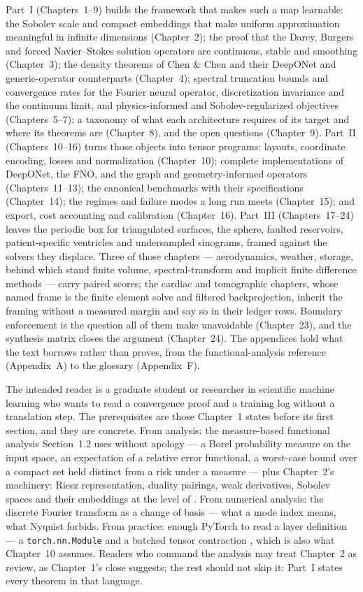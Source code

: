 Part~I (Chapters~1--9) builds the framework that makes such a map learnable: the Sobolev scale
and compact embeddings that make uniform approximation meaningful in infinite dimensions
(Chapter~2); the proof that the Darcy, Burgers and forced Navier--Stokes solution operators are
continuous, stable and smoothing (Chapter~3); the density theorems of Chen \& Chen and their
DeepONet and generic-operator counterparts (Chapter~4); spectral truncation bounds and
convergence rates for the Fourier neural operator, discretization invariance and the continuum
limit, and physics-informed and Sobolev-regularized objectives (Chapters~5--7); a taxonomy
of what each architecture requires of its target and where its theorems are (Chapter~8), and
the open questions (Chapter~9). Part~II (Chapters~10--16)
turns those objects into tensor programs: layouts, coordinate encoding, losses and normalization
(Chapter~10); complete implementations of DeepONet, the FNO, and the graph and geometry-informed
operators (Chapters~11--13); the canonical benchmarks with their specifications (Chapter~14);
the regimes and failure modes a long run meets (Chapter~15); and export, cost accounting and
calibration (Chapter~16). Part~III (Chapters~17--24) leaves the periodic box for triangulated
surfaces, the sphere, faulted reservoirs, patient-specific ventricles and undersampled
sinograms, framed against the solvers they displace. Three of those chapters --- aerodynamics,
weather, storage, behind which stand finite volume, spectral-transform and implicit finite
difference methods --- carry paired scores; the cardiac and tomographic chapters, whose named
frame is the finite element solve and filtered backprojection, inherit the framing without a
measured margin and say so in their ledger rows.
Boundary enforcement is the question all of them make unavoidable (Chapter~23), and the synthesis matrix closes
the argument (Chapter~24). The appendices hold what the text borrows rather than proves,
from the functional-analysis reference (Appendix~A) to the glossary (Appendix~F).

The intended reader is a graduate student or researcher in scientific machine learning who wants
to read a convergence proof and a training log without a translation step. The prerequisites are
those Chapter~1 states before its first section, and they are concrete. From analysis: the
measure-based functional analysis Section~1.2 uses without apology --- a Borel probability
measure on the input space, an expectation of a relative error functional, a worst-case bound
over a compact set held distinct from a risk under a measure --- plus Chapter~2's machinery:
Riesz representation, duality pairings, weak derivatives, Sobolev spaces and their embeddings at
the level of \cite{brezis2011functional, evans2010partial}. From numerical analysis: the
discrete Fourier transform as a change of basis --- what a mode index means, what Nyquist
forbids. From practice: enough PyTorch to read a layer definition --- a \texttt{torch.nn.Module}
and a batched tensor contraction \cite{paszke2019pytorch}, which is also what Chapter~10 assumes.
Readers who command the analysis may treat Chapter~2 as review, as Chapter~1's close suggests;
the rest should not skip it: Part~I states every theorem in that language.

